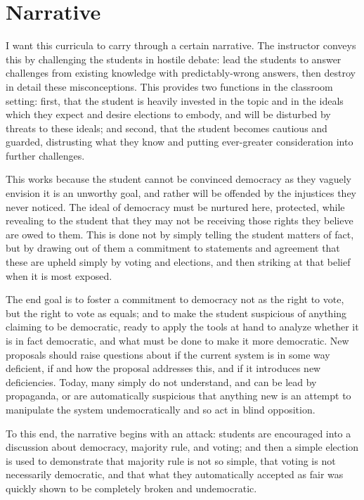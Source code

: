 \section{Narrative}

I want this curricula to carry through a certain narrative.  The instructor conveys this by challenging the students in hostile debate:  lead the students to answer challenges from existing knowledge with predictably-wrong answers, then destroy in detail these misconceptions.  This provides two functions in the classroom setting:  first, that the student is heavily invested in the topic and in the ideals which they expect and desire elections to embody, and will be disturbed by threats to these ideals; and second, that the student becomes cautious and guarded, distrusting what they know and putting ever-greater consideration into further challenges.

This works because the student cannot be convinced democracy as they vaguely envision it is an unworthy goal, and rather will be offended by the injustices they never noticed.  The ideal of democracy must be nurtured here, protected, while revealing to the student that they may not be receiving those rights they believe are owed to them.  This is done not by simply telling the student matters of fact, but by drawing out of them a commitment to statements and agreement that these are upheld simply by voting and elections, and then striking at that belief when it is most exposed.

The end goal is to foster a commitment to democracy not as the right to vote, but the right to vote as equals; and to make the student suspicious of anything claiming to be democratic, ready to apply the tools at hand to analyze whether it is in fact democratic, and what must be done to make it more democratic.  New proposals should raise questions about if the current system is in some way deficient, if and how the proposal addresses this, and if it introduces new deficiencies.  Today, many simply do not understand, and can be lead by propaganda, or are automatically suspicious that anything new is an attempt to manipulate the system undemocratically and so act in blind opposition.

To this end, the narrative begins with an attack:  students are encouraged into a discussion about democracy, majority rule, and voting; and then a simple election is used to demonstrate that majority rule is not so simple, that voting is not necessarily democratic, and that what they automatically accepted as fair was quickly shown to be completely broken and undemocratic.

